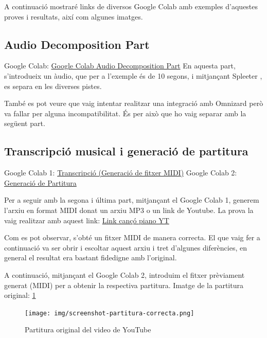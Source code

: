 \documentclass[10pt,a4paper,twocolumn,twoside]{article}
\begin{document}
A continuació mostraré links de diversos Google Colab amb exemples d'aquestes proves i resultats, així com algunes imatges.

\subsection{Audio Decomposition Part}

Google Colab: \href{https://colab.research.google.com/drive/1hnlwqaULE_wZDV8ZtSGldOrITDW8WQJs?usp=sharing}{Google Colab Audio Decomposition Part}
En aquesta part, s'introdueix un àudio, que per a l'exemple és de 10 segons, i mitjançant Spleeter \cite{spleeter2020}, es separa en les diverses pistes.

També es pot veure que vaig intentar realitzar una integració amb Omnizard però va fallar per alguna incompatibilitat. És per això que ho vaig separar amb la següent part.

\subsection{Transcripció musical i generació de partitura}

Google Colab 1: \href{https://colab.research.google.com/drive/1W1kDEtN0w8kRLiUZLePwhXBxqFlJAA4x?usp=sharing}{Transcripció (Generació de fitxer MIDI)}
Google Colab 2: \href{https://colab.research.google.com/drive/1tiGLzMGYfOxaYQx5lRwElC0yLjdWvwAU?usp=sharing}{Generació de Partitura}

Per a seguir amb la segona i última part, mitjançant el Google Colab 1, generem l'arxiu en format MIDI donat un arxiu MP3 o un link de Youtube.
La prova la vaig realitzar amb aquest link: \href{https://www.youtube.com/watch?v=aCUI6dNECeA&ab_channel=tocapartituras.com}{Link cançó piano YT}

Com es pot observar, s'obté un fitxer MIDI de manera correcta. El que vaig fer a continuació va ser obrir i escoltar aquest arxiu i tret d'algunes diferències, en general el resultat era bastant fidedigne amb l'original.

A continuació, mitjançant el Google Colab 2, introduim el fitxer prèviament generat (MIDI) per a obtenir la respectiva partitura.
Imatge de la partitura original: \ref{fig:paritura-original}
\begin{figure}
    \centering
    \texttt{[image: img/screenshot-partitura-correcta.png]}
    \caption{Partitura original del video de YouTube}
    \label{fig:paritura-original}
\end{figure}
\end{document}
